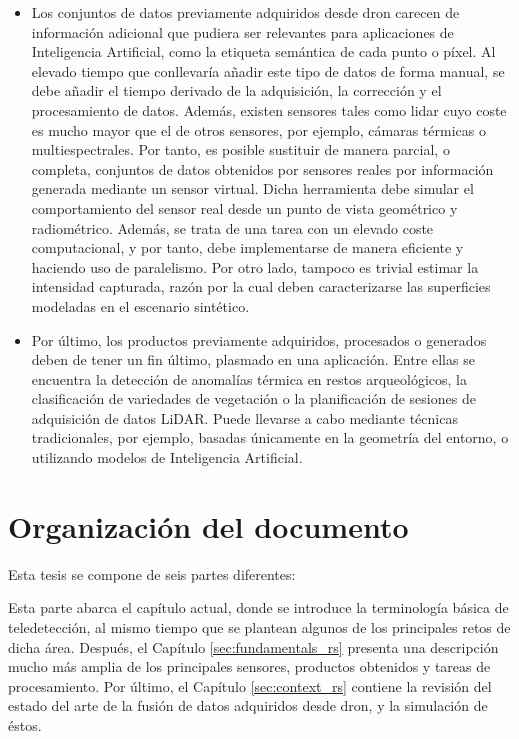 \begin{itemize}
    \item Los conjuntos de datos previamente adquiridos desde dron carecen de información adicional que pudiera ser relevantes para aplicaciones de Inteligencia Artificial, como la etiqueta semántica de cada punto o píxel. Al elevado tiempo que conllevaría añadir este tipo de datos de forma manual, se debe añadir el tiempo derivado de la adquisición, la corrección y el procesamiento de datos. Además, existen sensores tales como \acrshort{lidar} cuyo coste es mucho mayor que el de otros sensores, por ejemplo, cámaras térmicas o multiespectrales. Por tanto, es posible sustituir de manera parcial, o completa, conjuntos de datos obtenidos por sensores reales por información generada mediante un sensor virtual. Dicha herramienta debe simular el comportamiento del sensor real desde un punto de vista geométrico y radiométrico. Además, se trata de una tarea con un elevado coste computacional, y por tanto, debe implementarse de manera eficiente y haciendo uso de paralelismo. Por otro lado, tampoco es trivial estimar la intensidad capturada, razón por la cual deben caracterizarse las superficies modeladas en el escenario sintético.
    \item Por último, los productos previamente adquiridos, procesados o generados deben de tener un fin último, plasmado en una aplicación. Entre ellas se encuentra la detección de anomalías térmica en restos arqueológicos, la clasificación de variedades de vegetación o la planificación de sesiones de adquisición de datos LiDAR. Puede llevarse a cabo mediante técnicas tradicionales, por ejemplo, basadas únicamente en la geometría del entorno, o utilizando modelos de Inteligencia Artificial.
\end{itemize}

\section{Organización del documento}

Esta tesis se compone de seis partes diferentes:

\small {} \normalsize\hspace{3mm} Esta parte abarca el capítulo actual, donde se introduce la terminología básica de teledetección, al mismo tiempo que se plantean algunos de los principales retos de dicha área. Después, el Capítulo \ref{sec:fundamentals_rs} presenta una descripción mucho más amplia de los principales sensores, productos obtenidos y tareas de procesamiento. Por último, el Capítulo \ref{sec:context_rs} contiene la revisión del estado del arte de la fusión de datos adquiridos desde dron, y la simulación de éstos.

